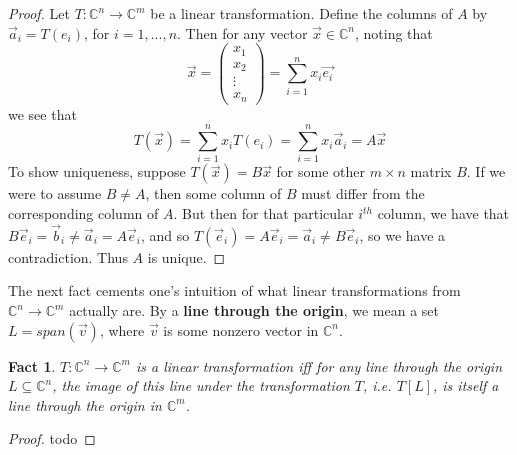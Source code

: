 \documentclass{article}
\theoremstyle{definition}
\theoremstyle{plain}
\theoremstyle{theorem}
\newtheorem{fact}{Fact}[section]
\begin{document}
\begin{proof}
	Let $T:\mathbb{C}^n \to \mathbb{C}^m$ be a linear transformation. Define the columns of $A$ by $\vec{a}_i = T(e_i)$, for $i = 1,...,n$. Then for any vector $\vec{x} \in \mathbb{C}^n$, noting that 
	\[ \vec{x} = \begin{pmatrix} x_1 \\ x_2 \\ \vdots \\ x_n \end{pmatrix} = \sum_{i=1}^n x_i\vec{e_i} \] we see that
	\[ T(\vec{x}) = \sum_{i=1}^n x_iT(e_i) = \sum_{i=1}^n x_i\vec{a}_i = A\vec{x} \]
	To show uniqueness, suppose $T(\vec{x}) = B\vec{x}$ for some other $m \times n$ matrix $B$. If we were to assume $B \neq A$, then some column of $B$ must differ from the corresponding column of $A$. But then for that particular $i^{th}$ column, we have that $B\vec{e}_i = \vec{b}_i \neq \vec{a}_i = A\vec{e}_i$, and so $T(\vec{e}_i) = A\vec{e}_i = \vec{a}_i \neq B\vec{e}_i$, so we have a contradiction. Thus $A$ is unique. 
\end{proof}
The next fact cements one's intuition of what linear transformations from $\mathbb{C}^n \to \mathbb{C}^m$ actually are. By a \textbf{line through the origin}, we mean a set $L = span(\vec{v})$, where $\vec{v}$ is some nonzero vector in $\mathbb{C}^n$.
\begin{fact}
	$T:\mathbb{C}^n \to \mathbb{C}^m$ is a linear transformation iff for any line through the origin $L \subseteq \mathbb{C}^n$, the image of this line under the transformation $T$, i.e. $T[L]$, is itself a line through the origin in $\mathbb{C}^m$. 
\end{fact}
\begin{proof}
	todo
\end{proof}
\end{document}
